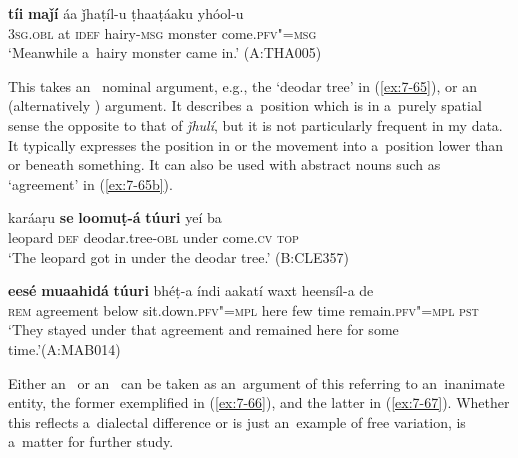 \begin{exe}
\ex
\label{ex:7-64}
\gll \textbf{tíi} \textbf{maǰí} áa ǰhaṭíl-u ṭhaaṭáaku yhóol-u \\
\textsc{3sg.obl} at \textsc{idef} hairy-\textsc{msg} monster come.\textsc{pfv"=msg} \\
\glt `Meanwhile a~hairy monster came in.' (A:THA005)
\end{exe}

 This  takes an~ nominal argument, e.g., the `deodar tree' in (\ref{ex:7-65}), or an~ (alternatively )  argument. It describes a~position which is in a~purely spatial sense the opposite to that of \textit{ǰhulí}, but it is not particularly frequent in my data. It typically expresses the position in or the movement into a~position lower than or beneath something. It can also be used with abstract nouns such as `agreement' in  (\ref{ex:7-65b}).

\begin{exe}
\ex
\label{ex:7-65}
\gll karáaṛu \textbf{se} \textbf{loomuṭ-á} \textbf{túuri} yeí ba \\
leopard \textsc{def} deodar.tree-\textsc{obl} under come.\textsc{cv} \textsc{top} \\
\glt `The leopard got in under the deodar tree.' (B:CLE357)

\ex
\label{ex:7-65b}
\gll \textbf{eesé} \textbf{muaahidá} \textbf{ túuri} bhéṭ-a índi aakatí waxt heensíl-a de\\
\textsc{rem} agreement below sit.down.\textsc{pfv"=mpl} here few time remain.\textsc{pfv"=mpl} \textsc{pst}\\
\glt `They stayed under that agreement and remained here for some time.'\newline (A:MAB014)
\end{exe}

Either an~ or an~  can be taken as an~argument of this  referring to an~inanimate entity, the former exemplified in (\ref{ex:7-66}), and the latter in (\ref{ex:7-67}). Whether this reflects a~dialectal difference or is just an~example of free variation, is a~matter for further study.

